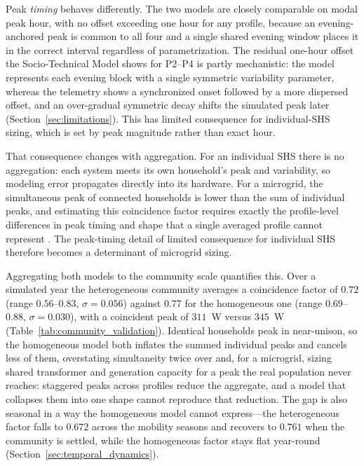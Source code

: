 \documentclass[final,3p,times,onecolumn]{elsarticle}
\begin{document}
Peak \emph{timing} behaves differently. The two models are closely comparable on modal peak hour, with no offset exceeding one hour for any profile, because an evening-anchored peak is common to all four and a single shared evening window places it in the correct interval regardless of parametrization. The residual one-hour offset the Socio-Technical Model shows for P2--P4 is partly mechanistic: the model represents each evening block with a single symmetric variability parameter, whereas the telemetry shows a synchronized onset followed by a more dispersed offset, and an over-gradual symmetric decay shifts the simulated peak later (Section~\ref{sec:limitations}). This has limited consequence for individual-SHS sizing, which is set by peak magnitude rather than exact hour.

That consequence changes with aggregation. For an individual SHS there is no aggregation: each system meets its own household's peak and variability, so modeling error propagates directly into its hardware. For a microgrid, the simultaneous peak of connected households is lower than the sum of individual peaks, and estimating this coincidence factor requires exactly the profile-level differences in peak timing and shape that a single averaged profile cannot represent \citep{XXXX}. The peak-timing detail of limited consequence for individual SHS therefore becomes a determinant of microgrid
sizing.

Aggregating both models to the community scale quantifies this. Over a simulated year the heterogeneous community averages a coincidence factor of $0.72$ (range $0.56$--$0.83$, $\sigma=0.056$) against $0.77$ for the homogeneous one (range $0.69$--$0.88$, $\sigma=0.030$), with a coincident peak of $311$~W versus $345$~W (Table~\ref{tab:community_validation}). Identical households peak in near-unison, so the homogeneous model both inflates the summed individual peaks and cancels less of them, overstating simultaneity twice over and, for a microgrid, sizing shared transformer and generation capacity for a peak the real population never reaches: staggered peaks across profiles reduce the aggregate, and a model that collapses them into one shape cannot reproduce that reduction. The gap is also seasonal in a way the homogeneous model cannot express---the heterogeneous factor falls to $0.672$ across the mobility seasons and recovers to $0.761$ when the community is settled, while the homogeneous factor stays flat year-round (Section~\ref{sec:temporal_dynamics}).
\end{document}
